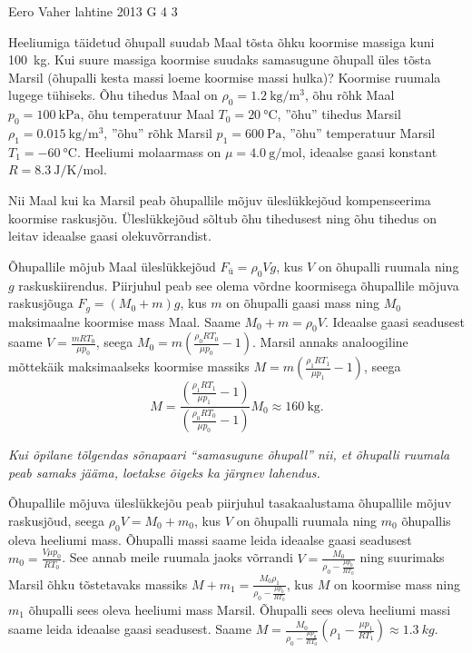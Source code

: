 {Eero Vaher} %
{lahtine} %
{2013} %
{G 4} %
{3} %
{
\ifStatement
Heeliumiga täidetud õhupall suudab Maal tõsta õhku koormise massiga kuni
\SI{100}{\kilogram}. Kui suure massiga koormise suudaks samasugune õhupall
üles tõsta Marsil (õhupalli kesta massi loeme koormise massi hulka)? 
Koormise ruumala lugege tühiseks. Õhu tihedus Maal on
$\rho_0=\SI{1.2}{\kilogram\per\meter^3}$,  õhu rõhk Maal
$p_0=\SI{100}{\kilo\pascal}$, õhu temperatuur Maal $T_0=\SI{20}{\celsius}$,
''õhu''
tihedus Marsil $\rho_1=\SI{0.015}{\kilogram\per\meter^3}$, ''õhu'' rõhk Marsil
$p_1=\SI{600}{\pascal}$, ''õhu'' temperatuur Marsil $T_1=\SI{-60}{\celsius}$.
Heeliumi molaarmass on $\mu=\SI{4.0}{\gram\per\mole}$, ideaalse gaasi konstant
$R=\SI{8.3}{\joule\per\kelvin\per\mole}$.
\fi


\ifHint
Nii Maal kui ka Marsil peab õhupallile mõjuv üleslükkejõud kompenseerima koormise raskusjõu. Üleslükkejõud sõltub õhu tihedusest ning õhu tihedus on leitav ideaalse gaasi olekuvõrrandist.
\fi


\ifSolution
Õhupallile mõjub Maal üleslükkejõud $F_{ü}=\rho_0Vg$, kus $V$ on õhupalli ruumala ning $g$ raskuskiirendus. Piirjuhul peab see olema võrdne koormisega õhupallile mõjuva raskusjõuga $F_g=(M_0+m)g$, kus $m$ on õhupalli gaasi mass ning $M_0$ maksimaalne koormise mass Maal. Saame $M_0+m=\rho_0V$. Ideaalse gaasi seadusest saame $V=\frac{mRT_0}{\mu p_0}$, seega $M_0=m(\frac{\rho_0 RT_0}{\mu p_0}-1)$. Marsil annaks analoogiline mõttekäik maksimaalseks koormise massiks $M=m(\frac{\rho_1RT_1}{\mu p_1}-1)$, seega \[M=\frac{(\frac{\rho_1RT_1}{\mu p_1}-1)}{(\frac{\rho_0RT_0}{\mu p_0}-1)}M_0\approx \SI{160}{\kilogram}.\]

{\em Kui õpilane tõlgendas sõnapaari ``samasugune õhupall'' nii, et õhupalli ruumala peab samaks jääma, loetakse õigeks ka järgnev lahendus.}

Õhupallile mõjuva üleslükkejõu peab piirjuhul tasakaalustama õhupallile mõjuv raskusjõud, seega $\rho_0 V=M_0+m_0$, kus $V$ on õhupalli ruumala ning $m_0$ õhupallis oleva heeliumi mass. Õhupalli massi saame leida ideaalse gaasi seadusest $m_0=\frac{V\mu p_0}{RT_0}$. See annab meile ruumala jaoks võrrandi $V=\frac{M_0}{\rho_0-\frac{\mu p_0}{RT_0}}$ ning suurimaks Marsil õhku tõstetavaks massiks $M+m_1=\frac{M_0\rho_1}{\rho_0-\frac{\mu p_0}{RT_0}}$, kus $M$ on koormise mass ning $m_1$ õhupalli sees oleva heeliumi mass Marsil. Õhupalli sees oleva heeliumi massi saame leida ideaalse gaasi seadusest. Saame $M=\frac{M_0}{\rho_0-\frac{\mu p_0}{RT_0}}(\rho_1-\frac{\mu p_1}{RT_1})\approx \SI{1,3}{kg}$.
\fi


}
